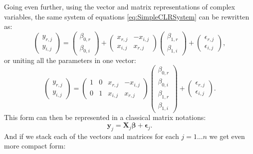 \documentclass[
]{book}
\begin{document}
Going even further, using the vector and matrix representations of complex variables, the same system of equations \eqref{eq:SimpleCLRSystem} can be rewritten as:
\begin{equation}
    \begin{pmatrix} y_{r,j} \\ y_{i,j} \end{pmatrix} = \begin{pmatrix} \beta_{0,r} \\ \beta_{0,i} \end{pmatrix} + \begin{pmatrix} x_{r,j} & -x_{i,j} \\ x_{i,j} & x_{r,j} \end{pmatrix} \begin{pmatrix} \beta_{1,r} \\ \beta_{1,i} \end{pmatrix} + \begin{pmatrix} \epsilon_{r,j} \\ \epsilon_{i,j} \end{pmatrix} ,
    \label{eq:SimpleCLRSystemVector01}
\end{equation}
or uniting all the parameters in one vector:
\begin{equation}
    \begin{pmatrix} y_{r,j} \\ y_{i,j} \end{pmatrix} = \begin{pmatrix} 1 & 0 & x_{r,j} & -x_{i,j} \\ 0 & 1 & x_{i,j} & x_{r,j} \end{pmatrix} \begin{pmatrix} \beta_{0,r} \\ \beta_{0,i} \\ \beta_{1,r} \\ \beta_{1,i} \end{pmatrix} + \begin{pmatrix} \epsilon_{r,j} \\ \epsilon_{i,j} \end{pmatrix} .
    \label{eq:SimpleCLRSystemVector02}
\end{equation}
This form can then be represented in a classical matrix notations:
\begin{equation}
    \mathbf{y}_j = \mathbf{X}_j \boldsymbol{\beta} + \boldsymbol{\epsilon}_j .
    \label{eq:SimpleCLRSystemVector03}
\end{equation}
And if we stack each of the vectors and matrices for each \(j=1 \dots n\) we get even more compact form:
\end{document}
